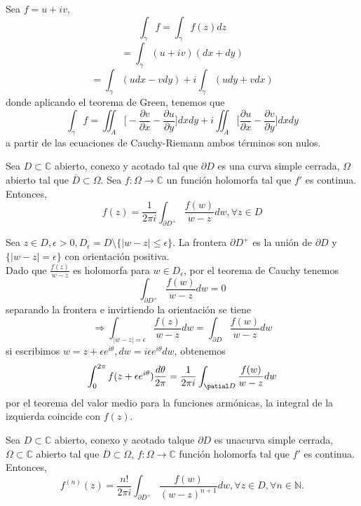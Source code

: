 \begin{dem}
  Sea $ f = u + i v $,
  \[ 
    \int_{\gamma}^{} f = \int_{\gamma}^{} f(z) dz 
  \] 
  \[ 
    = \int_{\gamma}^{} (u + i v)(dx + dy) 
  \] 
  \[ 
    = \int_{\gamma}^{} (u dx - v dy) + i \int_{\gamma}^{} (u dy + v dx)
  \] 
  donde aplicando el teorema de Green, tenemos que
  \[ 
    \int_{\gamma}^{} f = \iint_{A}^{} \Bigg[ - \frac{\partial{v}}{\partial{x}} - \frac{\partial{u}}{\partial{y}} \Bigg] dxdy + i \iint_{A}^{} \Bigg[ \frac{\partial{u}}{\partial{x}} - \frac{\partial{v}}{\partial{y}} \Bigg] dx dy
  \] 
  a partir de las ecuaciones de Cauchy-Riemann ambos términos son nulos.
\end{dem}

\begin{theo}
  Sea $D \subset \mathbb{C}$ abierto, conexo y acotado tal que $\partial D$ es una curva simple cerrada, $\Omega$ abierto tal que $\overline{D} \subset \Omega$. Sea $f: \Omega \to \mathbb{C}$ un función holomorfa tal que $f'$ es continua. Entonces,
  \[ 
    f(z) = \frac{1}{2 \pi i} \int_{\partial D^+}^{} \frac{f(w)}{w - z} dw, \forall z \in D 
  \] 
\end{theo}

\begin{dem}
  Sea $z \in D, \epsilon >0, D_{\epsilon} = D \setminus \{ | w - z | \leq \epsilon \}$. La frontera $\partial D^+$ es la unión de $\partial D$ y $\{ | w - z | = \epsilon \}$ con orientación positiva. \\

  Dado que $ \frac{f(z)}{w-z}$ es holomorfa para $w \in D_{\epsilon}$, por el teorema de Cauchy tenemos
  \[ 
    \int_{\partial D^+}^{} \frac{f(w)}{w - z} dw = 0 
  \] 
  separando la frontera e invirtiendo la orientación se tiene
  \[ 
    \Rightarrow \int_{|  w - z | = \epsilon}^{}  \frac{f(z)}{w-z} dw = \int_{\partial D}^{} \frac{f(w)}{w - z} dw 
  \] 
  si escribimos $w = z + \epsilon e^{i \theta}, dw = i \epsilon e^{i \theta} dw$, obtenemos
  \[ 
    \int_{0}^{2 \pi} f(z + \epsilon e^{i \theta}) \frac{d \theta}{2 \pi} =  \frac{1}{2 \pi i} \int_{\patial D}^{} \frac{f(w)}{w - z} dw
  \] 
  por el teorema del valor medio para la funciones armónicas, la integral de la izquierda coincide con $f(z)$.
\end{dem}

\begin{theo}
  Sea $D \subset \mathbb{C}$ abierto, conexo y acotado talque $\partial D$ es unacurva simple cerrada, $\Omega \subset \mathbb{C}$ abierto tal que $\overline{D} \subset \Omega$, $f: \Omega \to \mathbb{C}$ función holomorfa tal que $ f'$ es continua. Entonces,
  \[ 
    f^{(n)}(z) = \frac{n!}{2 \pi i} \int_{\partial D^+}^{} \frac{f(w)}{(w - z)^{n+1}} dw, \forall z \in D, \forall n \in \mathbb{N}.
  \] 
\end{theo}

